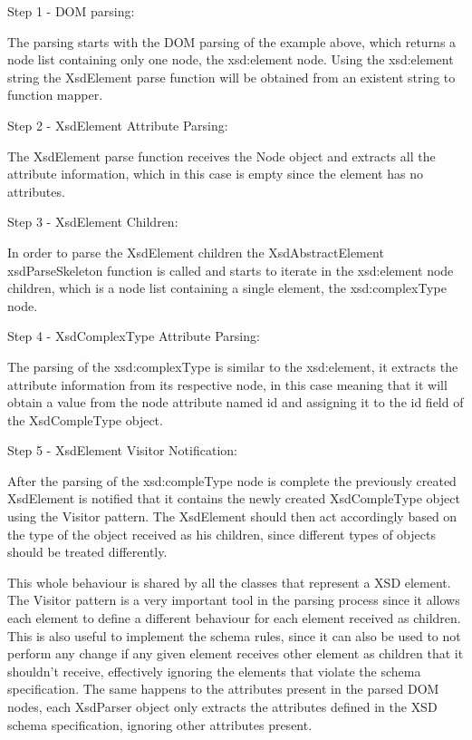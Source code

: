 Step 1 - DOM parsing:

\noindent
The parsing starts with the \ac{DOM} parsing of the example above, which returns a node list containing only one node, the xsd:element node. Using the xsd:element string the XsdElement parse function will be obtained from an existent string to function mapper. 

Step 2 - XsdElement Attribute Parsing:

\noindent
The XsdElement parse function receives the Node object and extracts all the attribute information, which in this case is empty since the element has no attributes. 

Step 3 - XsdElement Children:

\noindent
In order to parse the XsdElement children the XsdAbstractElement xsdParseSkeleton function is called and starts to iterate in the xsd:element node children, which is a node list containing a single element, the xsd:complexType node. 

Step 4 - XsdComplexType Attribute Parsing:

\noindent
The parsing of the xsd:complexType is similar to the xsd:element, it extracts the attribute information from its respective node, in this case meaning that it will obtain a value from the node attribute named id and assigning it to the id field of the XsdCompleType object. 

Step 5 - XsdElement Visitor Notification:

\noindent
After the parsing of the xsd:compleType node is complete the previously created XsdElement is notified that it contains the newly created XsdCompleType object using the Visitor pattern. The XsdElement should then act accordingly based on the type of the object received as his children, since different types of objects should be treated differently. 

\noindent
This whole behaviour is shared by all the classes that represent a \ac{XSD} element. The Visitor pattern is a very important tool in the parsing process since it allows each element to define a different behaviour for each element received as children. This is also useful to implement the schema rules, since it can also be used to not perform any change if any given element receives other element as children that it shouldn't receive, effectively ignoring the elements that violate the schema specification. The same happens to the attributes present in the parsed \ac{DOM} nodes, each XsdParser object only extracts the attributes defined in the \ac{XSD} schema specification, ignoring other attributes present.

